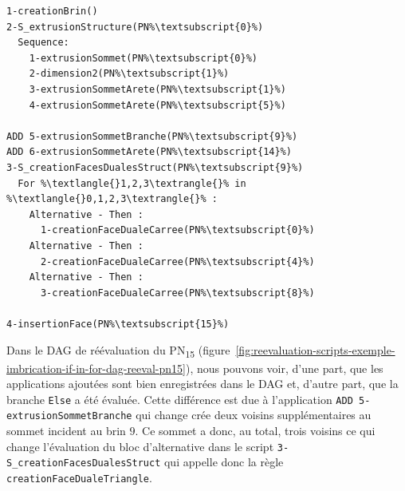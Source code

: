 \begin{lstlisting}[style=script-style,
escapechar=\%,
caption=Spécification paramétrique initiale de la création du dual d'un chemin 2D,
label=lst:reevaluation-scripts-imbrication-exemples-for-in-if-spec-reeval,
captionpos=b]
1-creationBrin()
2-S_extrusionStructure(PN%\textsubscript{0}%)
  Sequence:
    1-extrusionSommet(PN%\textsubscript{0}%)
    2-dimension2(PN%\textsubscript{1}%)
    3-extrusionSommetArete(PN%\textsubscript{1}%)
    4-extrusionSommetArete(PN%\textsubscript{5}%)

ADD 5-extrusionSommetBranche(PN%\textsubscript{9}%)
ADD 6-extrusionSommetArete(PN%\textsubscript{14}%)
3-S_creationFacesDualesStruct(PN%\textsubscript{9}%)
  For %\textlangle{}1,2,3\textrangle{}% in %\textlangle{}0,1,2,3\textrangle{}% :
    Alternative - Then :
      1-creationFaceDualeCarree(PN%\textsubscript{0}%)
    Alternative - Then :
      2-creationFaceDualeCarree(PN%\textsubscript{4}%)
    Alternative - Then :
      3-creationFaceDualeCarree(PN%\textsubscript{8}%)

4-insertionFace(PN%\textsubscript{15}%)
\end{lstlisting}


Dans le DAG de réévaluation du PN\textsubscript{15} (figure~\ref{fig:reevaluation-scripts-exemple-imbrication-if-in-for-dag-reeval-pn15}),
nous pouvons voir, d'une part, que les applications ajoutées sont bien
enregistrées dans le DAG et, d'autre part, que la branche \texttt{Else} a été
évaluée. %
Cette différence est due à l'application \texttt{ADD 5-extrusionSommetBranche}
qui change crée deux voisins supplémentaires au sommet incident au brin \(9\). %
Ce sommet a donc, au total, trois voisins ce qui change l'évaluation du bloc
d'alternative dans le script
\texttt{3-\allowbreak{}S\allowbreak\_creationFacesDualesStruct} qui appelle donc
la règle \texttt{creationFaceDualeTriangle}. %

